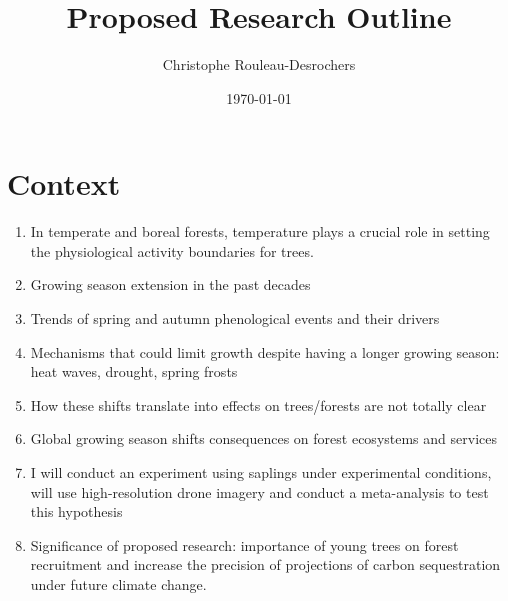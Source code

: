 \documentclass{article}
\title{Proposed Research Outline}
\date{\today}
\author{Christophe Rouleau-Desrochers}
\begin{document}

\maketitle



\section{Context}
\begin {enumerate}
	\item In temperate and boreal forests, temperature plays a crucial role in setting the physiological activity boundaries for trees.
	\item Growing season extension in the past decades
	\item Trends of spring and autumn phenological events and their drivers %
	\item Mechanisms that could limit growth despite having a longer growing season: heat waves, drought, spring frosts
	\item How these shifts translate into effects on trees/forests are not totally clear
	\item Global growing season shifts consequences on forest ecosystems and services
	\item I will conduct an experiment using saplings under experimental conditions, will use high-resolution drone imagery and conduct a meta-analysis to test this hypothesis
	\item Significance of proposed research: importance of young trees on forest recruitment and increase the precision of projections of carbon sequestration under future climate change. 
\end {enumerate}
\end{document}
